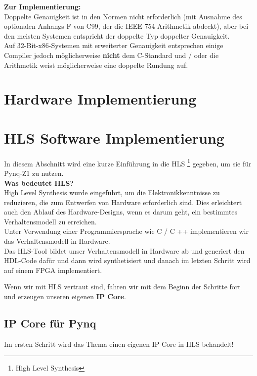 \documentclass[a4paper]{report}
\begin{document}
\vspace{5mm}
\textbf{Zur Implementierung:}\\
Doppelte Genauigkeit ist in den Normen nicht erforderlich (mit Ausnahme des optionalen Anhangs F von C99, der die IEEE 754-Arithmetik abdeckt), aber bei den meisten Systemen entspricht der doppelte Typ doppelter Genauigkeit.\\
Auf 32-Bit-x86-Systemen mit erweiterter Genauigkeit entsprechen einige Compiler jedoch möglicherweise \textbf{nicht} dem C-Standard und / oder die Arithmetik weist möglicherweise eine doppelte Rundung auf.\\



\section{Hardware Implementierung}




\section{HLS Software Implementierung}
In diesem Abschnitt wird eine kurze Einführung in die HLS \footnote{High Level Synthesis} gegeben, um sie für Pynq-Z1 zu nutzen.\\
\textbf{Was bedeutet HLS?}\\
 High Level Synthesis wurde eingeführt, um die Elektronikkenntnisse zu reduzieren, die zum Entwerfen von Hardware erforderlich sind. Dies erleichtert auch den Ablauf des Hardware-Designs, wenn es darum geht, ein bestimmtes Verhaltensmodell zu erreichen.\\
 Unter Verwendung einer Programmiersprache wie C / C ++ implementieren wir das Verhaltensmodell in Hardware. \\
 Das HLS-Tool bildet unser Verhaltensmodell in Hardware ab und generiert den HDL-Code dafür und dann wird synthetisiert und danach im letzten Schritt wird  auf einem FPGA implementiert.

Wenn wir mit HLS vertraut sind, fahren wir mit dem Beginn der Schritte fort und erzeugen unseren eigenen \textbf{IP Core}.
\subsection{IP Core für Pynq}
Im ersten Schritt wird das Thema einen eigenen IP Core in HLS behandelt!\\
\end{document}
